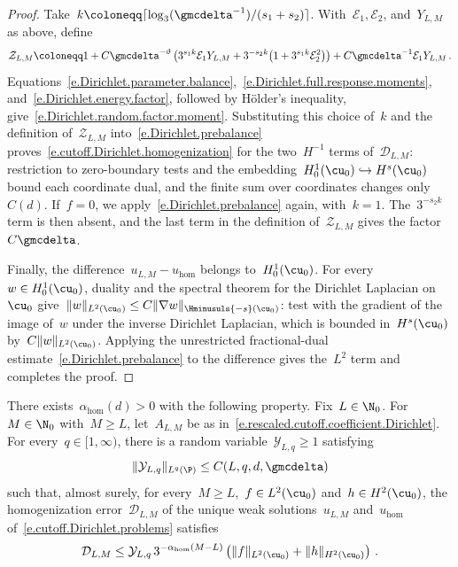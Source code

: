 \documentclass[11pt]{amsart}
\begin{document}
\begin{proof}
\smallskip

Take~$k\coloneqq\lceil\log_3(\gmcdelta^{-1})/(s_1+s_2)\rceil$. With~$\mathcal E_1,\mathcal E_2$, and~$Y_{L,M}$ as above, define
\begin{equation*}
	\mathcal Z_{L,M}
	\coloneqq 1
	+C\gmcdelta^{-\vartheta}
	\left(
	3^{s_1k}\mathcal E_1Y_{L,M}
	+3^{-s_2k}\bigl(1+3^{s_1k}\mathcal E_2^2\bigr)
	\right)
	+C\gmcdelta^{-1}\mathcal E_1Y_{L,M}\,.
\end{equation*}
Equations~\eqref{e.Dirichlet.parameter.balance},~\eqref{e.Dirichlet.full.response.moments}, and~\eqref{e.Dirichlet.energy.factor}, followed by H\"older's inequality, give~\eqref{e.Dirichlet.random.factor.moment}.  Substituting this choice of~$k$ and the definition of~$\mathcal Z_{L,M}$ into~\eqref{e.Dirichlet.prebalance} proves~\eqref{e.cutoff.Dirichlet.homogenization} for the two~$H^{-1}$ terms of~$\mathcal D_{L,M}$: restriction to zero-boundary tests and the embedding~$H^1_0(\cu_0)\hookrightarrow H^s(\cu_0)$ bound each coordinate dual, and the finite sum over coordinates changes only~$C(d)$.  If~$f=0$, we apply~\eqref{e.Dirichlet.prebalance} again, with~$k=1$.  The~$3^{-s_2k}$ term is then absent, and the last term in the definition of~$\mathcal Z_{L,M}$ gives the factor~$C\gmcdelta$.

\smallskip

Finally, the difference~$u_{L,M}-u_{\mathrm{hom}}$ belongs to~$H_0^1(\cu_0)$. For every~$w\in H_0^1(\cu_0)$, duality and the spectral theorem for the Dirichlet Laplacian on~$\cu_0$ give~$\|w\|_{L^2(\cu_0)}\leq C\|\nabla w\|_{\Hminusuls{-s}(\cu_0)}$: test with the gradient of the image of~$w$ under the inverse Dirichlet Laplacian, which is bounded in~$H^s(\cu_0)$ by~$C\|w\|_{L^2(\cu_0)}$. Applying the unrestricted fractional-dual estimate~\eqref{e.Dirichlet.prebalance} to the difference gives the~$L^2$ term and completes the proof.
\end{proof}

\begin{theorem}
\label{t.fixed.cutoff.Dirichlet.algebraic}
There exists~$\alpha_{\mathrm{hom}}(d)>0$ with the following property. Fix~$L\in\N_0$. For~$M\in\N_0$ with~$M\geq L$, let~$A_{L,M}$ be as in~\eqref{e.rescaled.cutoff.coefficient.Dirichlet}. For every~$q\in[1,\infty)$, there is a random variable~$\mathcal Y_{L,q}\geq1$ satisfying
\begin{equation}
	\|\mathcal Y_{L,q}\|_{L^q(\P)}
	\leq C(L,q,d,\gmcdelta)
	\label{e.fixed.cutoff.Dirichlet.random.factor}
\end{equation}
such that, almost surely, for every~$M\geq L$,~$f\in L^2(\cu_0)$ and~$h\in H^2(\cu_0)$, the homogenization error~$\mathcal D_{L,M}$ of the unique weak solutions~$u_{L,M}$ and~$u_{\mathrm{hom}}$ of~\eqref{e.cutoff.Dirichlet.problems} satisfies
\begin{equation}
	\mathcal D_{L,M}
	\leq
	\mathcal Y_{L,q}\,
	3^{-\alpha_{\mathrm{hom}}(M-L)}
	\left(
	\|f\|_{L^2(\cu_0)}+\|h\|_{H^2(\cu_0)}
	\right)\,.
	\label{e.fixed.cutoff.Dirichlet.algebraic}
\end{equation}
\end{theorem}
\end{document}
